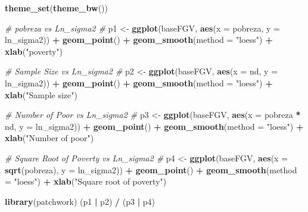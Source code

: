 \documentclass[
  12pt,
]{book}
\newenvironment{Shaded}{\begin{snugshade}}{\end{snugshade}}
\newcommand{\AttributeTok}[1]{\textcolor[rgb]{0.13,0.29,0.53}{#1}}
\newcommand{\CommentTok}[1]{\textcolor[rgb]{0.56,0.35,0.01}{\textit{#1}}}
\newcommand{\FunctionTok}[1]{\textcolor[rgb]{0.13,0.29,0.53}{\textbf{#1}}}
\newcommand{\NormalTok}[1]{#1}
\newcommand{\OtherTok}[1]{\textcolor[rgb]{0.56,0.35,0.01}{#1}}
\newcommand{\SpecialCharTok}[1]{\textcolor[rgb]{0.81,0.36,0.00}{\textbf{#1}}}
\newcommand{\StringTok}[1]{\textcolor[rgb]{0.31,0.60,0.02}{#1}}
\begin{document}
\begin{Shaded}
\begin{Highlighting}[]
\FunctionTok{theme\_set}\NormalTok{(}\FunctionTok{theme\_bw}\NormalTok{())}

\CommentTok{\# pobreza vs Ln\_sigma2 \#}
\NormalTok{p1 }\OtherTok{\textless{}{-}} \FunctionTok{ggplot}\NormalTok{(baseFGV, }\FunctionTok{aes}\NormalTok{(}\AttributeTok{x =}\NormalTok{ pobreza, }\AttributeTok{y =}\NormalTok{ ln\_sigma2)) }\SpecialCharTok{+}
  \FunctionTok{geom\_point}\NormalTok{() }\SpecialCharTok{+}
  \FunctionTok{geom\_smooth}\NormalTok{(}\AttributeTok{method =} \StringTok{"loess"}\NormalTok{) }\SpecialCharTok{+}
  \FunctionTok{xlab}\NormalTok{(}\StringTok{"poverty"}\NormalTok{)}

\CommentTok{\# Sample Size vs Ln\_sigma2 \#}
\NormalTok{p2 }\OtherTok{\textless{}{-}} \FunctionTok{ggplot}\NormalTok{(baseFGV, }\FunctionTok{aes}\NormalTok{(}\AttributeTok{x =}\NormalTok{ nd, }\AttributeTok{y =}\NormalTok{ ln\_sigma2)) }\SpecialCharTok{+} 
  \FunctionTok{geom\_point}\NormalTok{() }\SpecialCharTok{+}
  \FunctionTok{geom\_smooth}\NormalTok{(}\AttributeTok{method =} \StringTok{"loess"}\NormalTok{) }\SpecialCharTok{+} 
  \FunctionTok{xlab}\NormalTok{(}\StringTok{"Sample size"}\NormalTok{)}

\CommentTok{\# Number of Poor vs Ln\_sigma2 \#}
\NormalTok{p3 }\OtherTok{\textless{}{-}} \FunctionTok{ggplot}\NormalTok{(baseFGV, }\FunctionTok{aes}\NormalTok{(}\AttributeTok{x =}\NormalTok{ pobreza }\SpecialCharTok{*}\NormalTok{ nd, }\AttributeTok{y =}\NormalTok{ ln\_sigma2)) }\SpecialCharTok{+} 
  \FunctionTok{geom\_point}\NormalTok{() }\SpecialCharTok{+}
  \FunctionTok{geom\_smooth}\NormalTok{(}\AttributeTok{method =} \StringTok{"loess"}\NormalTok{) }\SpecialCharTok{+} 
  \FunctionTok{xlab}\NormalTok{(}\StringTok{"Number of poor"}\NormalTok{)}

\CommentTok{\# Square Root of Poverty vs Ln\_sigma2 \#}
\NormalTok{p4 }\OtherTok{\textless{}{-}} \FunctionTok{ggplot}\NormalTok{(baseFGV, }\FunctionTok{aes}\NormalTok{(}\AttributeTok{x =} \FunctionTok{sqrt}\NormalTok{(pobreza), }\AttributeTok{y =}\NormalTok{ ln\_sigma2)) }\SpecialCharTok{+} 
  \FunctionTok{geom\_point}\NormalTok{() }\SpecialCharTok{+}
  \FunctionTok{geom\_smooth}\NormalTok{(}\AttributeTok{method =} \StringTok{"loess"}\NormalTok{) }\SpecialCharTok{+} 
  \FunctionTok{xlab}\NormalTok{(}\StringTok{"Square root of poverty"}\NormalTok{)}

\FunctionTok{library}\NormalTok{(patchwork)}
\NormalTok{(p1 }\SpecialCharTok{|}\NormalTok{ p2) }\SpecialCharTok{/}\NormalTok{ (p3 }\SpecialCharTok{|}\NormalTok{ p4)}
\end{Highlighting}
\end{Shaded}
\end{document}
